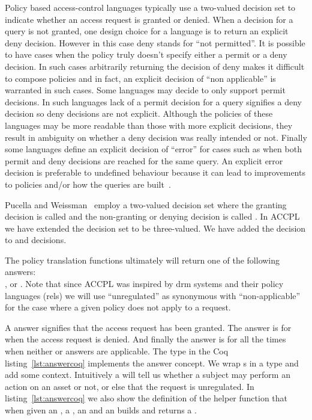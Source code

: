 Policy based access-control languages typically use a two-valued decision set to indicate whether an access request is granted or denied. When a decision for a query is not granted, one design choice for a language is to return an explicit deny decision. However in this case deny stands for ``not permitted''. It is possible to have cases when the policy truly doesn't specify either a permit or a deny decision. In such cases arbitrarily returning the decision of deny makes it difficult to compose policies and in fact, an explicit decision of ``non applicable'' is warranted in such cases. Some languages may decide to only support permit decisions. In such languages lack of a permit decision for a query signifies a deny decision so deny decisions are not explicit. Although the policies of these languages may be more readable than those with more explicit decisions, they result in ambiguity on whether a deny decision was really intended or not. Finally some languages define an explicit decision of ``error'' for cases such as when both permit and deny decisions are reached for the same query. An explicit error decision is preferable to undefined behaviour because it can lead to improvements to policies and/or how the queries are built~\cite{Tschantz}. 

Pucella and Weissman~\cite{pucella2006} employ a two-valued decision set where the granting decision is called  and the non-granting or denying decision is called . In \ac{ACCPL} we have extended the decision set to be three-valued. We have added the  decision to  and  decisions. 


The policy translation functions ultimately will return one of the following answers: \\,  or . Note that since \ac{ACCPL} was inspired by \ac{drm} systems and their policy languages (\ac{rel}s) we will use ``unregulated'' as synonymous with ``non-applicable'' for the case where a given policy does not apply to a request.


A  answer signifies that the access request has been granted. The  answer is for when the access request is denied. And finally the  answer is for all the times when neither  or  answers are applicable. The  type in the Coq listing~\ref{lst:answercoq} implements the answer concept. We wrap s in a  type and add some context. Intuitively a  will tell us whether a subject may perform an action on an asset or not, or else that the request is unregulated. In listing~\ref{lst:answercoq} we also show the definition of the helper function  that when given an , a , an  and an  builds and returns a .


